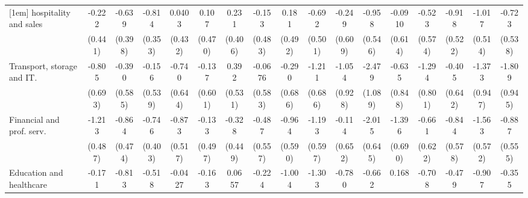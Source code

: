 {\begin{tabular}{l*{16}{c}}
[1em]
hospitality and sales&      -0.222         &      -0.639         &      -0.814\sym{*}  &      0.0403         &       0.107         &       0.231         &      -0.153         &       0.181         &      -0.692         &      -0.249         &      -0.958         &     -0.0910         &      -0.523         &      -0.918         &      -1.017\sym{*}  &      -0.723         \\
                    &     (0.441)         &     (0.398)         &     (0.353)         &     (0.432)         &     (0.470)         &     (0.406)         &     (0.483)         &     (0.492)         &     (0.501)         &     (0.609)         &     (0.546)         &     (0.614)         &     (0.574)         &     (0.522)         &     (0.514)         &     (0.538)         \\
[1em]
Transport, storage and IT.&      -0.805         &      -0.390         &      -0.156         &      -0.740         &      -0.137         &       0.392         &     -0.0676         &      -0.290         &      -1.211         &      -1.054         &      -2.479\sym{*}  &      -0.635         &      -1.294         &      -0.405         &      -1.373         &      -1.809         \\
                    &     (0.693)         &     (0.585)         &     (0.539)         &     (0.644)         &     (0.601)         &     (0.531)         &     (0.583)         &     (0.686)         &     (0.686)         &     (0.928)         &     (1.089)         &     (0.848)         &     (0.801)         &     (0.642)         &     (0.947)         &     (0.945)         \\
[1em]
Financial and prof. serv.&      -1.213\sym{*}  &      -0.864         &      -0.746         &      -0.873         &      -0.133         &      -0.328         &      -0.487         &      -0.964         &      -1.193\sym{*}  &      -0.114         &      -2.015\sym{**} &      -1.396\sym{*}  &      -0.661         &      -0.844         &      -1.563\sym{**} &      -0.887         \\
                    &     (0.487)         &     (0.474)         &     (0.403)         &     (0.517)         &     (0.497)         &     (0.449)         &     (0.557)         &     (0.590)         &     (0.597)         &     (0.652)         &     (0.645)         &     (0.690)         &     (0.622)         &     (0.578)         &     (0.572)         &     (0.555)         \\
[1em]
Education and healthcare&      -0.171         &      -0.813         &      -0.518         &     -0.0427         &      -0.163         &      0.0657         &      -0.224         &      -1.004         &      -1.303\sym{**} &      -0.780         &      -0.662         &       0.168         &      -0.708         &      -0.479         &      -0.907         &      -0.355         \\

\end{tabular}}
